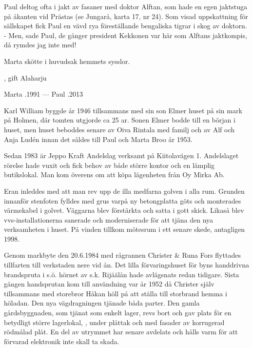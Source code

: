 Paul deltog ofta i jakt av fasaner med doktor Alftan, som hade en egen jaktstuga på åkanten vid Prästas (se Jungarå, karta 17, nr 24). Som visad uppskattning för sällskapet fick Paul en vävd rya föreställande bengaliska tigrar i skog av doktorn. - Men, sade Paul, de gånger president Kekkonen var här som Alftans jaktkompis, då rymdes jag inte med!

Marta skötte i huvudsak hemmets sysslor.
\begin{jhchildren}
  \item {}, gift Alaharju
  \item {}
\end{jhchildren}

Marta .1991  ---  Paul .2013


Karl William byggde år 1946 tillsammans med sin son Elmer huset på sin mark på Holmen, där tomten utgjorde ca 25 ar. Sonen Elmer bodde till en början i huset, men huset beboddes senare av Oiva Rintala med familj och av Alf och Anja Ludén innan det såldes till Paul och Marta Broo år 1953.






Sedan 1983 är Jeppo Kraft Andelslag verksamt på Kiitolavägen 1. Andelslaget rörelse hade vuxit och fick behov av både större kontor och en lämplig butikslokal. Man kom överens om att köpa lägenheten från Oy Mirka Ab.

Eran inleddes med att man rev upp de illa medfarna golven i alla rum. Grunden innanför stenfoten fylldes med grus varpå ny betongplatta göts och monterades värmekabel i golvet. Väggarna blev förstärkta och satta i gott skick. Likaså blev vvs-installationerna sanerade och moderniserade för att tjäna den nya verksamheten i huset. På vinden tillkom mötesrum i ett senare skede, antagligen 1998.

Genom markbyte den 20.6.1984 med rågrannen Christer \& Runa Fors flyttades tillfarten till verkstaden nere vid ån. Det lilla förvaringshuset för byns handdrivna brandspruta i s.ö. hörnet av s.k. Rijäälån hade avlägsnats redan tidigare. Sista gången handsprutan kom till användning var år 1952 då Christer själv tillsammans med storebror Håkan höll på att ställa till storbrand hemma i höladan. Den nya vägdragningen tjänade båda parter. Den gamla gårdsbyggnaden, som tjänat som enkelt lager, revs bort och gav plats för en betydligt större lagerlokal, , under plåttak och med fasader av korrugerad rödmålad plåt. En del av utrymmet har senare avdelats och hålls varm för att förvarad elektronik inte skall ta skada.

